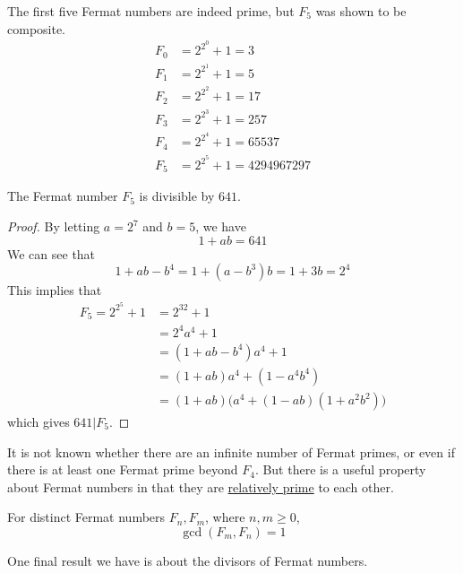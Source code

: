 \documentclass{article}
\newcounter{theorem}[section]
\begin{document}
The first five Fermat numbers are indeed prime, but $F_5$ was shown to be composite. 
\begin{align*}
    F_0 &= 2^{2^0} + 1 = 3 \\
    F_1 &= 2^{2^1} + 1 = 5 \\
    F_2 &= 2^{2^2} + 1 = 17 \\
    F_3 &= 2^{2^3} + 1 = 257 \\
    F_4 &= 2^{2^4} + 1 = 65537 \\
    F_5 &= 2^{2^5} + 1 = 4294967297
\end{align*}

\begin{theorem}[$641$ Divides $F_5$]
  \label{thm:641-divides-f5}
The Fermat number $F_5$ is divisible by $641$. 
\end{theorem}
\begin{proof}
By letting $a = 2^7$ and $b = 5$, we have 
\begin{equation}
  1 + ab = 641
\end{equation}
We can see that
\begin{equation}
  1 + ab - b^4 = 1 + (a-b^3) b = 1 + 3b = 2^4
\end{equation}
This implies that 
\begin{align*}
    F_5 = 2^{2^5} + 1 & = 2^{32} + 1 \\
    & = 2^4 a^4 + 1\\
    & = (1+ab-b^4) a^4 + 1 \\
    & = (1+ab) a^4 + (1-a^4 b^4) \\
    & = (1+ab) \big( a^4 + (1-ab)(1+a^2 b^2)\big)
\end{align*}
which gives $641 | F_5$. 
\end{proof}

It is not known whether there are an infinite number of Fermat primes, or even if there is at least one Fermat prime beyond $F_4$. But there is a useful property about Fermat numbers in that they are \hyperref[def:relatively-prime]{relatively prime} to each other. 

\begin{lemma}
  \label{thm:distinct-fermat-numbers-are-coprime}
For distinct Fermat numbers $F_n, F_m$, where $n,m \geq 0$, 
\begin{equation}
  \gcd(F_m, F_n) = 1
\end{equation}
\end{lemma}

One final result we have is about the divisors of Fermat numbers. 
\end{document}
